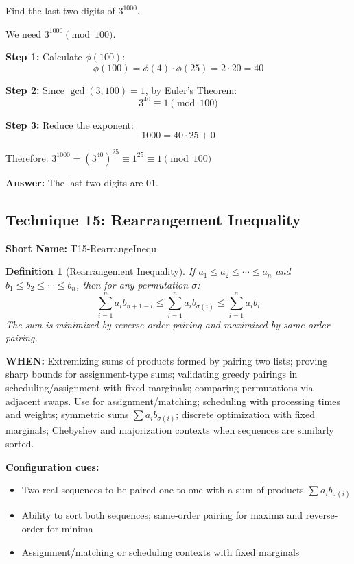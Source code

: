 \documentclass[12pt]{article}
\newtheorem{definition}{Definition}[section]
\newenvironment{problem}[1]
{\begin{tcolorbox}[colback=blue!5!white,colframe=blue!75!black,title={#1}]}{\end{tcolorbox}}
\newenvironment{solution}
{\begin{tcolorbox}[colback=green!5!white,colframe=green!75!black,title={Solution}]}{\end{tcolorbox}}
\begin{document}
\begin{problem}{Example: Large Exponent Modulo Composite}
Find the last two digits of $3^{1000}$.
\end{problem}

\begin{solution}
We need $3^{1000} \pmod{100}$.

\textbf{Step 1:} Calculate $\phi(100)$:
\[
\phi(100) = \phi(4) \cdot \phi(25) = 2 \cdot 20 = 40
\]

\textbf{Step 2:} Since $\gcd(3, 100) = 1$, by Euler's Theorem:
\[
3^{40} \equiv 1 \pmod{100}
\]

\textbf{Step 3:} Reduce the exponent:
\[
1000 = 40 \cdot 25 + 0
\]

Therefore: $3^{1000} = (3^{40})^{25} \equiv 1^{25} \equiv 1 \pmod{100}$

\textbf{Answer:} The last two digits are $01$.
\end{solution}

\subsection{Technique 15: Rearrangement Inequality}
\textbf{Short Name:} T15-RearrangeInequ

\begin{definition}[Rearrangement Inequality]
If $a_1 \leq a_2 \leq \cdots \leq a_n$ and $b_1 \leq b_2 \leq \cdots \leq b_n$, then for any permutation $\sigma$:
\[
\sum_{i=1}^n a_i b_{n+1-i} \leq \sum_{i=1}^n a_i b_{\sigma(i)} \leq \sum_{i=1}^n a_i b_i
\]
The sum is minimized by reverse order pairing and maximized by same order pairing.
\end{definition}

\textbf{WHEN:} Extremizing sums of products formed by pairing two lists; proving sharp bounds for assignment-type sums; validating greedy pairings in scheduling/assignment with fixed marginals; comparing permutations via adjacent swaps. Use for assignment/matching; scheduling with processing times and weights; symmetric sums $\sum a_i b_{\sigma(i)}$; discrete optimization with fixed marginals; Chebyshev and majorization contexts when sequences are similarly sorted.

\textbf{Configuration cues:}
\begin{itemize}
    \item Two real sequences to be paired one-to-one with a sum of products $\sum a_i b_{\sigma(i)}$
    \item Ability to sort both sequences; same-order pairing for maxima and reverse-order for minima
    \item Assignment/matching or scheduling contexts with fixed marginals
\end{itemize}
\end{document}
